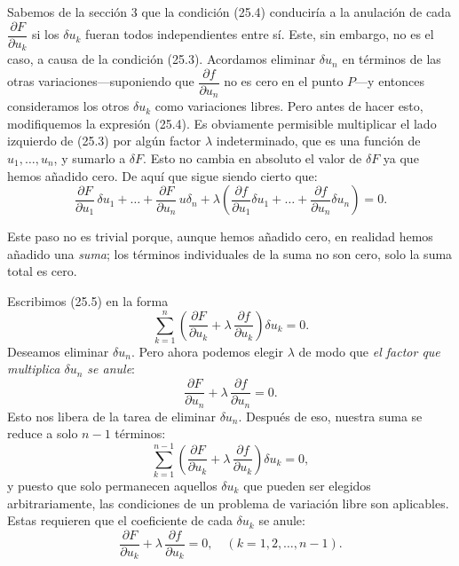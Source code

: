 \documentclass[12pt,a4paper]{book}
\begin{document}
Sabemos de la sección 3 que la condición (25.4) conduciría a la anulación de cada $\dfrac{\partial F}{\partial u_k}$ si los $\delta u_k$ fueran todos independientes entre sí. Este, sin embargo, no es el caso, a causa de la condición (25.3). Acordamos eliminar $\delta u_n$ en términos de las otras variaciones---suponiendo que $\dfrac{\partial f}{\partial u_n}$ no es cero en el punto $P$---y entonces consideramos los otros $\delta u_k$ como variaciones libres. Pero antes de hacer esto, modifiquemos la expresión (25.4). Es obviamente permisible multiplicar el lado izquierdo de (25.3) por algún factor $\lambda$ indeterminado, que es una función de $u_1, \ldots, u_n$, y sumarlo a $\delta F$. Esto no cambia en absoluto el valor de $\delta F$ ya que hemos añadido cero. De aquí que sigue siendo cierto que:
\begin{equation}
\frac{\partial F}{\partial u_1} \, \delta u_1 + \ldots + \frac{\partial F}{\partial u_n} \, u\delta_n + \lambda \left( \frac{\partial f}{\partial u_1} \delta u_1 + \ldots + \frac{\partial f}{\partial u_n} \delta u_n \right) = 0. \tag{25.5}
\end{equation}

Este paso no es trivial porque, aunque hemos añadido cero, en realidad hemos añadido una \textit{suma}; los términos individuales de la suma no son cero, solo la suma total es cero.

Escribimos (25.5) en la forma
\begin{equation}
\sum_{k=1}^{n} \left( \frac{\partial F}{\partial u_k} + \lambda \, \frac{\partial f}{\partial u_k} \right) \delta u_k = 0. \tag{25.6}
\end{equation}
Deseamos eliminar $\delta u_n$. Pero ahora podemos elegir $\lambda$ de modo que \textit{el factor que multiplica $\delta u_n$ se anule}:
\begin{equation}
\frac{\partial F}{\partial u_n} + \lambda \, \frac{\partial f}{\partial u_n} = 0. \tag{25.7}
\end{equation}
Esto nos libera de la tarea de eliminar $\delta u_n$. Después de eso, nuestra suma se reduce a solo $n-1$ términos:
\begin{equation}
\sum_{k=1}^{n-1} \left( \frac{\partial F}{\partial u_k} + \lambda \, \frac{\partial f}{\partial u_k} \right) \delta u_k = 0, \tag{25.8}
\end{equation}
y puesto que solo permanecen aquellos $\delta u_k$ que pueden ser elegidos arbitrariamente, las condiciones de un problema de variación libre son aplicables. Estas requieren que el coeficiente de cada $\delta u_k$ se anule:
\begin{equation}
\frac{\partial F}{\partial u_k} + \lambda \, \frac{\partial f}{\partial u_k} = 0, \quad (k = 1, 2, \ldots, n-1). \tag{25.9}
\end{equation}
\end{document}
